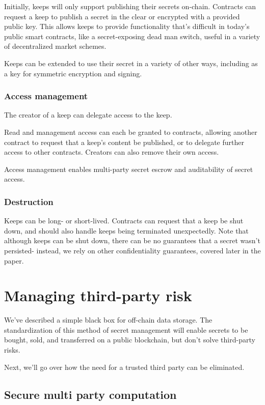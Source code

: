 \documentclass[11pt]{article}
\begin{document}
Initially, keeps will only support publishing their secrets on-chain.
Contracts can request a keep to publish a secret in the clear or
encrypted with a provided public key. This allows keeps to provide
functionality that’s difficult in today’s public smart contracts, like
a secret-exposing dead man switch, useful in a variety of
decentralized market schemes.

Keeps can be extended to use their secret in a variety of other ways,
including as a key for symmetric encryption and signing.

\subsubsection{Access management}

The creator of a keep can delegate access to the keep.

Read and management access can each be granted to contracts, allowing
another contract to request that a keep’s content be published, or to
delegate further access to other contracts. Creators can also remove
their own access.

Access management  enables multi-party secret escrow and auditability
of secret access.

\subsubsection{Destruction}

Keeps can be long- or short-lived. Contracts can request that a keep
be shut down, and should also handle keeps being terminated
unexpectedly. Note that although keeps can be shut down, there can be
no guarantees that a secret wasn’t persisted- instead, we rely on
other confidentiality guarantees, covered later in the paper.

\section{Managing third-party risk}

We’ve described a simple black box for off-chain data storage. The
standardization of this method of secret management will enable
secrets to be bought, sold, and transferred on a public blockchain,
but don’t solve third-party risks.

Next, we’ll go over how the need for a trusted third party can be
eliminated.

\subsection{Secure multi party computation}
\end{document}
